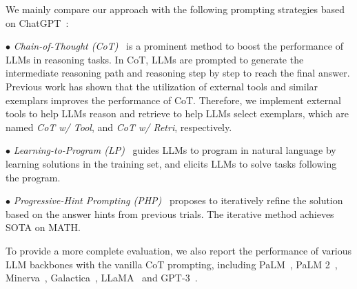We mainly compare our approach with the following prompting strategies based on ChatGPT~\cite{ChatGPT}: 

$\bullet$ \emph{Chain-of-Thought (CoT)}~\cite{CoT} is a prominent method to boost the performance of LLMs in reasoning tasks.
In CoT, LLMs are prompted to generate the intermediate reasoning path and reasoning step by step to reach the final answer.
Previous work has shown that the utilization of external tools and similar exemplars improves the performance of CoT.
Therefore, we implement external tools to help LLMs reason and retrieve to help LLMs select exemplars, which are named \emph{CoT w/ Tool}, and \emph{CoT w/ Retri}, respectively.

$\bullet$ \emph{Learning-to-Program (LP)}~\cite{LP} guides LLMs to program in natural language by learning solutions in the training set, and elicits LLMs to solve tasks following the program.

$\bullet$ \emph{Progressive-Hint Prompting (PHP)}~\cite{PHP} proposes to iteratively refine the solution based on the answer hints from previous trials. The iterative method achieves SOTA on MATH.

To provide a more complete evaluation, we also report the performance of various LLM backbones with the vanilla CoT prompting, including PaLM~\cite{PaLM}, PaLM 2~\cite{PaLM-2}, Minerva~\cite{Minerva}, Galactica~\cite{Galactica}, LLaMA~\cite{LLaMA} and GPT-3~\cite{GPT-3}.

